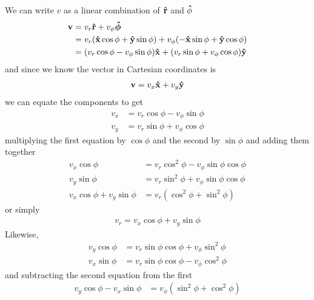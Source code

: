\documentclass[../hw.tex]{subfiles}
\begin{document}
We can write $v$ as a linear combination of $\vu{r}$ and $\vu{\phi}$
\begin{align*}
    \vb{v} &= v_r \vu{r} + v_\phi \vu*{\phi} \\
    &= v_r (\vu{x} \cos \phi + \vu{y} \sin \phi) + v_\phi (-\vu{x} \sin \phi + \vu{y} \cos \phi) \\
    &= (v_r \cos \phi - v_\phi \sin \phi) \vu{x} + (v_r \sin \phi + v_\phi \cos \phi) \vu{y}
\end{align*}
and since we know the vector in Cartesian coordinates is
\begin{align*}
    \vb{v} = v_x \vu{x} + v_y \vu{y}
\end{align*}
we can equate the components to get
\begin{align*}
    v_x &= v_r \cos \phi - v_\phi \sin \phi \\
    v_y &= v_r \sin \phi + v_\phi \cos \phi
\end{align*}
multiplying the first equation by $\cos\phi$ and the second by $\sin\phi$ and adding them together
\begin{align*}
    v_x \cos\phi &= v_r \cos^2\phi - v_\phi \sin\phi\cos\phi \\
    v_y \sin\phi &= v_r \sin^2\phi + v_\phi \sin\phi\cos\phi \\
    v_x \cos\phi + v_y \sin\phi &= v_r (\cos^2\phi + \sin^2\phi)
\end{align*}
or simply
\begin{align*}
    v_r = v_x \cos\phi + v_y \sin\phi
\end{align*}
Likewise,
\begin{align*}
    v_y \cos\phi &= v_r \sin\phi\cos\phi + v_\phi \sin^2\phi \\
    v_x \sin\phi &= v_r \sin\phi\cos\phi - v_\phi \cos^2\phi
\end{align*}
and subtracting the second equation from the first
\begin{align*}
    v_y \cos\phi - v_x \sin\phi &= v_\phi (\sin^2\phi + \cos^2\phi)
\end{align*}
\end{document}

